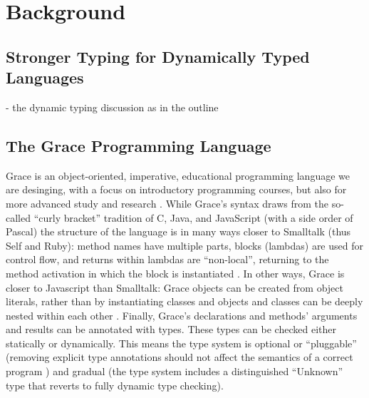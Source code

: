
\section{Background}
\label{sec:background}

\subsection{Stronger Typing for Dynamically Typed Languages}

\begin{cnote}
- the dynamic typing discussion as in the outline
\end{cnote}

\subsection{The Grace Programming Language}

Grace is an object-oriented, imperative, educational programming
language we are desinging, with a focus on introductory programming
courses, but also for more advanced study and research
\cite{graceAbsence,seekinGraceSIGCSE}.  While Grace's syntax draws
from the so-called ``curly bracket'' tradition of C, Java, and
JavaScript (with a side order of Pascal) the structure of the language
is in many ways closer to Smalltalk (thus Self and Ruby): method names
have multiple parts, blocks (lambdas) are used for control flow, and
returns within lambdas are ``non-local'', returning to the method
activation in which the block is instantiated \cite{bluebook}.  In
other ways, Grace is closer to Javascript than Smalltalk: Grace
objects can be created from object literals, rather than by
instantiating classes \cite{Black2007-emeraldHOPL,JonesECOOP2016} and
objects and classes can be deeply nested within each other
\cite{betabook}.  Finally, Grace's declarations and methods' arguments
and results can be annotated with types.  These types can be checked
either statically or dynamically. This means the type system is
optional or ``pluggable'' \cite{GiladPliggable2004} (removing explicit
type annotations should not affect the semantics of a correct program
\cite{gradualGuaratee}) and gradual (the type system includes a
distinguished ``Unknown'' type that reverts to fully
dynamic type checking).

